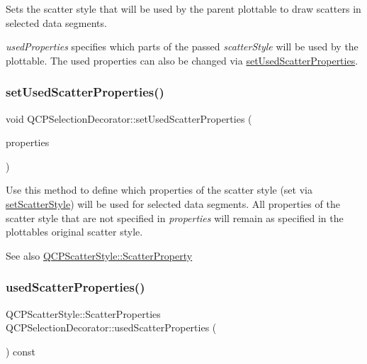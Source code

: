 Sets the scatter style that will be used by the parent plottable to draw scatters in selected data segments.

{\itshape used\+Properties} specifies which parts of the passed {\itshape scatter\+Style} will be used by the plottable. The used properties can also be changed via \mbox{\hyperlink{class_q_c_p_selection_decorator_a808c1607cd4e83869c04986e332455c0}{set\+Used\+Scatter\+Properties}}. \mbox{\label{class_q_c_p_selection_decorator_a808c1607cd4e83869c04986e332455c0}} 
\subsubsection{\texorpdfstring{setUsedScatterProperties()}{setUsedScatterProperties()}}
{\footnotesize\ttfamily void Q\+C\+P\+Selection\+Decorator\+::set\+Used\+Scatter\+Properties (\begin{DoxyParamCaption}\item[{const Q\+C\+P\+Scatter\+Style\+::\+Scatter\+Properties \&}]{properties }\end{DoxyParamCaption})}

Use this method to define which properties of the scatter style (set via \mbox{\hyperlink{class_q_c_p_selection_decorator_ab403a613289714ff4fd4a0c0371ab116}{set\+Scatter\+Style}}) will be used for selected data segments. All properties of the scatter style that are not specified in {\itshape properties} will remain as specified in the plottable\textquotesingle{}s original scatter style.

\begin{DoxySeeAlso}{See also}
\mbox{\hyperlink{class_q_c_p_scatter_style_a8974f6a20f8f6eea7781f0e6af9deb46}{Q\+C\+P\+Scatter\+Style\+::\+Scatter\+Property}} 
\end{DoxySeeAlso}
\mbox{\label{class_q_c_p_selection_decorator_ab2019bf31dde39f1ec028e3810dfc08b}} 
\subsubsection{\texorpdfstring{usedScatterProperties()}{usedScatterProperties()}}
{\footnotesize\ttfamily Q\+C\+P\+Scatter\+Style\+::\+Scatter\+Properties Q\+C\+P\+Selection\+Decorator\+::used\+Scatter\+Properties (\begin{DoxyParamCaption}{ }\end{DoxyParamCaption}) const\hspace{0.3cm}{\ttfamily [inline]}}



